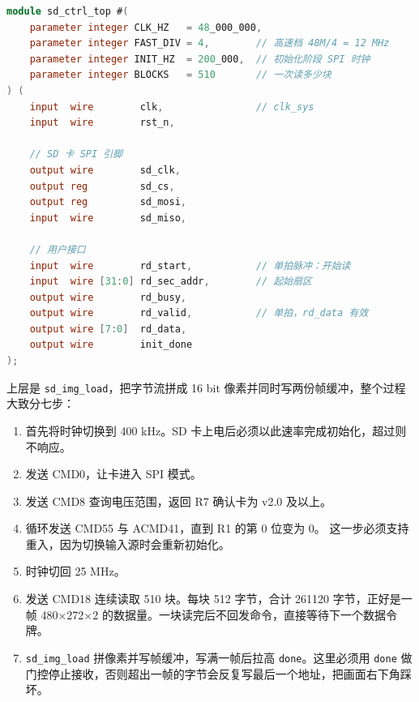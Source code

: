 \documentclass[withoutpreface,bwprint]{cumcmthesis}
\begin{document}
\begin{lstlisting}[language=Verilog, basicstyle=\ttfamily\zihao{6},
                   frame=single, rulecolor=\color{boxFrame}]
module sd_ctrl_top #(
    parameter integer CLK_HZ   = 48_000_000,
    parameter integer FAST_DIV = 4,        // 高速档 48M/4 = 12 MHz
    parameter integer INIT_HZ  = 200_000,  // 初始化阶段 SPI 时钟
    parameter integer BLOCKS   = 510       // 一次读多少块
) (
    input  wire        clk,                // clk_sys
    input  wire        rst_n,

    // SD 卡 SPI 引脚
    output wire        sd_clk,
    output reg         sd_cs,
    output reg         sd_mosi,
    input  wire        sd_miso,

    // 用户接口
    input  wire        rd_start,           // 单拍脉冲：开始读
    input  wire [31:0] rd_sec_addr,        // 起始扇区
    output wire        rd_busy,
    output wire        rd_valid,           // 单拍，rd_data 有效
    output wire [7:0]  rd_data,
    output wire        init_done
);
\end{lstlisting}

上层是 \texttt{sd\_img\_load}，把字节流拼成 16 bit 像素并同时写两份帧缓冲，整个过程大致分七步：


\begin{enumerate}
\item 首先将时钟切换到 400 kHz。SD 卡上电后必须以此速率完成初始化，超过则不响应。
\item 发送 CMD0，让卡进入 SPI 模式。
\item 发送 CMD8 查询电压范围，返回 R7 确认卡为 v2.0 及以上。
\item 循环发送 CMD55 与 ACMD41，直到 R1 的第 0 位变为 0。
      这一步必须支持重入，因为切换输入源时会重新初始化。
\item 时钟切回 25 MHz。
\item 发送 CMD18 连续读取 510 块。每块 512 字节，合计 261120 字节，正好是一帧 480×272×2 的数据量。一块读完后不回发命令，直接等待下一个数据令牌。
\item \texttt{sd\_img\_load} 拼像素并写帧缓冲，写满一帧后拉高 \texttt{done}。这里必须用 \texttt{done} 做门控停止接收，否则超出一帧的字节会反复写最后一个地址，把画面右下角踩坏。
\end{enumerate}

\end{document}
